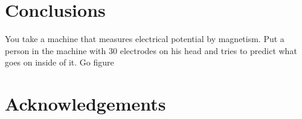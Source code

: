 \documentclass{article}
\begin{document}
\vfill
\pagebreak
\fi
\section{Conclusions}
You take a machine that measures electrical potential by magnetism. Put a person in the machine with 30 electrodes on his head and tries to predict what goes on inside of it. Go figure
\section{Acknowledgements}


\end{document}
